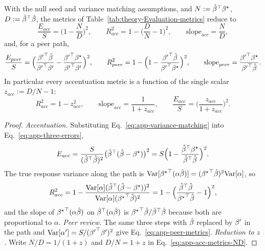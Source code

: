 \begin{cor}
\label{cor:app-three-evaluations}
With the null seed and variance matching assumptions, and $N:={\hat{\beta}}^\top{\beta^{\star}}$,
$D:={\hat{\beta}}^\top\hat{\beta}$, the metrics of Table~\ref{tab:theory-Evaluation-metrics}
reduce to
\begin{equation}
\frac{E_{acc}}{S}=\Big(1-\frac ND\Big)^2,\qquad
R^2_{acc}=1-\Big(\frac DN-1\Big)^2,\qquad
\mathrm{slope}_{acc}=\frac ND,
\label{eq:app-acc-metrics-ND}
\end{equation}
and, for a peer path,
\begin{equation}
\frac{E_{peer}}{S}=\Big(\frac{{{\beta^{\prime}}}^\top\hat{\beta}}{{{\beta^{\prime}}}^\top{\beta^{\prime}}}-\frac{{{\beta^{\prime}}}^\top{\beta^{\star}}}{{{\beta^{\prime}}}^\top{\beta^{\prime}}}\Big)^2,\qquad
R^2_{peer}=1-\Big(1-\frac{{{\beta^{\prime}}}^\top\hat{\beta}}{{{\beta^{\prime}}}^\top{\beta^{\star}}}\Big)^2,\qquad
\mathrm{slope}_{peer}=\frac{{{\beta^{\prime}}}^\top{\beta^{\star}}}{{{\beta^{\prime}}}^\top\hat{\beta}}.
\label{eq:app-peer-metrics}
\end{equation}
In particular every accentuation metric is a function of the single scalar
$z_{acc}:=D/N-1$:
\begin{equation}
R^2_{acc}=1-z_{acc}^2,\qquad
\mathrm{slope}_{acc}=\frac1{1+z_{acc}},\qquad
\frac{E_{acc}}{S}=\Big(\frac{z_{acc}}{1+z_{acc}}\Big)^2 .
\label{eq:app-acc-metrics-z}
\end{equation}
\end{cor}
\begin{proof}
\emph{Accentuation.}  Substituting Eq.~\ref{eq:app-variance-matching} into
Eq.~\ref{eq:app-three-errors},
\[
E_{acc}=\frac{S}{({\hat{\beta}}^\top\hat{\beta})^2}\big({\hat{\beta}}^\top(\hat{\beta}-{\beta^{\star}})\big)^2
=S\Big(1-\frac{{\hat{\beta}}^\top{\beta^{\star}}}{{\hat{\beta}}^\top\hat{\beta}}\Big)^2 .
\]
The true response variance along the path is
$\mathrm{Var}[{{\beta^{\star}}}^\top(\alpha\hat{\beta})]=({{\beta^{\star}}}^\top\hat{\beta})^2\mathrm{Var}[\alpha]$, so
\[
R^2_{acc}=1-\frac{\mathrm{Var}[\alpha]({\hat{\beta}}^\top(\hat{\beta}-{\beta^{\star}}))^2}{\mathrm{Var}[\alpha]({{\beta^{\star}}}^\top\hat{\beta})^2}
=1-\Big(\frac{{\hat{\beta}}^\top\hat{\beta}}{{{\beta^{\star}}}^\top\hat{\beta}}-1\Big)^2 ,
\]
and the slope of ${{\beta^{\star}}}^\top(\alpha\hat{\beta})$ on ${\hat{\beta}}^\top(\alpha\hat{\beta})$ is
${{\beta^{\star}}}^\top\hat{\beta}/{\hat{\beta}}^\top\hat{\beta}$ because both are proportional to
$\alpha$.
\emph{Peer review.}  The same three steps with $\hat{\beta}$ replaced by ${\beta^{\prime}}$
in the path and $\mathrm{Var}[\alpha']=S/({{\beta^{\prime}}}^\top{\beta^{\prime}})^2$ give
Eq.~\ref{eq:app-peer-metrics}.
\emph{Reduction to $z$.}  Write $N/D=1/(1+z)$ and $D/N=1+z$ in
Eq.~\ref{eq:app-acc-metrics-ND}.
\end{proof}

